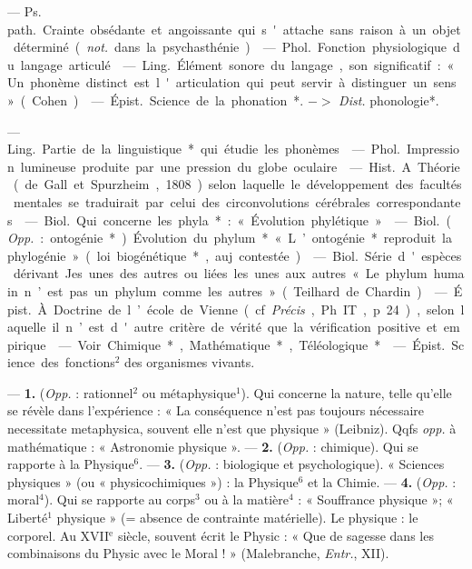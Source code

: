 \begin{itemize}[leftmargin=1cm, label=, itemsep=1pt]
 — \si{Ps. path.} Crainte obsédante
et angoissante qui s'attache sans
raison à un objet déterminé ({\it not.}
dans la psychasthénie).

 — \si{Phol.} Fonction physiologique du langage articulé.

 — \si{Ling.} Élément sonore du
langage, son significatif : « Un phonème distinct est l'articulation qui
peut servir à distinguer un sens »
(Cohen).

 — \si{Épist.} Science de la
phonation*. $->$ {\it Dist.} phonologie*.

 — \si{Ling.} Partie de la linguistique* qui étudie les phonèmes.

 — \si{Phol.} Impression lumineuse produite par une pression du
globe oculaire.

 — \si{Hist.} A. Théorie (de
Gall et Spurzheim, 1808) selon laquelle le développement des facultés
mentales se traduirait par celui des
circonvolutions cérébrales correspondantes.

 — \si{Biol.} Qui concerne les
phyla* : « Évolution phylétique ».

 — \si{Biol.} ({\it Opp.} : ontogénie*). Évolution du phylum*
« L’ontogénie* reproduit la phylogénie » (loi biogénétique*, auj. contestée).

 — \si{Biol.} Série d'espèces dérivant Jes unes des autres ou liées les
unes aux autres « Le phylum
humain n’est pas un phylum comme
les autres » (Teilhard de Chardin).

 — \si{Épist.} À. Doctrine de
l’école de Vienne (cf. {\it Précis}, Ph. IT,
p. 24), selon laquelle il n’est d'autre
critère de vérité que la vérification
positive et empirique.

 — Voir Chimique*, Mathématique*, Téléologique*.

 — \si{Épist.} Science des
fonctions$^2$ des organismes vivants.

 — {\bf 1.} ({\it Opp.} : rationnel$^2$
ou métaphysique$^1$). Qui concerne la
nature, telle qu’elle se révèle dans
l'expérience : « La conséquence n’est
pas toujours nécessaire necessitate
metaphysica, souvent elle n’est que
physique » (Leibniz). Qqfs {\it opp.} à
mathématique : « Astronomie physique ». — {\bf 2.} ({\it Opp.} : chimique). Qui
se rapporte à la Physique$^6$. — {\bf 3.}
({\it Opp.} : biologique et psychologique).
« Sciences physiques » (ou « physicochimiques ») : la Physique$^6$ et la
Chimie. — {\bf 4.} ({\it Opp.} : moral$^4$). Qui se
rapporte au corps$^3$ ou à la matière$^4$ :
« Souffrance physique »; « Liberté$^1$
physique » (= absence de contrainte
matérielle). Le physique : le corporel.
Au {\footnotesize XVII}$^\text{e}$ siècle, souvent écrit le
Physic : « Que de sagesse dans les
combinaisons du Physic avec le
Moral ! » (Malebranche, {\it Entr.}, XII).


\end{itemize}
